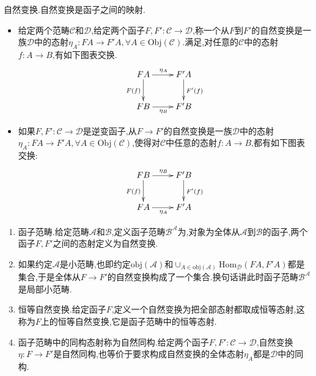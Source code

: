 自然变换.自然变换是函子之间的映射.
\begin{itemize}
	\item 给定两个范畴$\mathscr{C}$和$\mathscr{D}$,给定两个函子$F,F':\mathscr{C}\to\mathscr{D}$,称一个从$F$到$F'$的自然变换是一族$\mathscr{D}$中的态射$\eta_A:FA\to F'A,\forall A\in\mathrm{Obj}(\mathscr{C})$.满足,对任意的$\mathscr{C}$中的态射$f:A\to B$,有如下图表交换.
	$$\xymatrix{FA\ar[r]^{\eta_A}\ar[d]_{F(f)}&F'A\ar[d]^{F'(f)}\\FB\ar[r]_{\eta_B}&F'B}$$
	\item 如果$F,F':\mathscr{C}\to\mathscr{D}$是逆变函子,从$F\to F'$的自然变换是一族$\mathscr{D}$中的态射$\eta_A:FA\to F'A,\forall A\in\mathrm{Obj}(\mathscr{C})$,使得对$\mathscr{C}$中任意的态射$f:A\to B$,都有如下图表交换:
	$$\xymatrix{FB\ar[r]^{\eta_B}\ar[d]_{F(f)}&F'B\ar[d]^{F'(f)}\\FA\ar[r]_{\eta_A}&F'A}$$
\end{itemize}
\begin{enumerate}
	\item 函子范畴.给定范畴$\mathscr{A}$和$\mathscr{B}$,定义函子范畴$\mathscr{B}^{\mathscr{A}}$为,对象为全体从$\mathscr{A}$到$\mathscr{B}$的函子,两个函子$F,F'$之间的态射定义为自然变换.
	\item 如果约定$\mathscr{A}$是小范畴,也即约定$\mathrm{obj}(\mathscr{A})$和$\cup_{A\in\mathrm{obj}(\mathscr{A})}\mathrm{Hom}_{\mathscr{D}}(FA,F'A)$都是集合,于是全体从$F\to F'$的自然变换构成了一个集合.换句话讲此时函子范畴$\mathscr{B}^{\mathscr{A}}$是局部小范畴.
	\item 恒等自然变换.给定函子$F$,定义一个自然变换为把全部态射都取成恒等态射,这称为$F$上的恒等自然变换,它是函子范畴中的恒等态射.
	\item 函子范畴中的同构态射称为自然同构.给定两个函子$F,F':\mathscr{C}\to\mathscr{D}$,自然变换$\eta:F\to F'$是自然同构,也等价于要求构成自然变换的全体态射$\eta_A$都是$\mathscr{D}$中的同构.
\end{enumerate}

